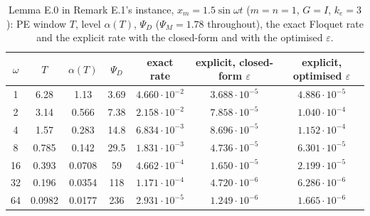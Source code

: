 \begin{table}[htbp]
\centering
\small
\caption{Lemma E.0 in Remark E.1's instance, $x_m=1.5\sin\omega t$ ($m=n=1$, $G=I$, $k_e=3$): PE window $T$, level
$\alpha(T)$, $\Psi_D$ ($\Psi_M=1.78$ throughout), the exact Floquet rate and the explicit rate with the closed-form
and with the optimised $\varepsilon$.}
\label{tab:evidence:explicitomega}
\begin{tabular}{@{}ccccccc@{}}
\toprule
$\omega$ & $T$ & $\alpha(T)$ & $\Psi_D$ & exact rate & explicit, closed-form $\varepsilon$
  & explicit, optimised $\varepsilon$\\
\midrule
1  & 6.28   & 1.13   & 3.69 & $4.660\cdot10^{-2}$ & $3.688\cdot10^{-5}$ & $4.886\cdot10^{-5}$\\
2  & 3.14   & 0.566  & 7.38 & $2.158\cdot10^{-2}$ & $7.858\cdot10^{-5}$ & $1.040\cdot10^{-4}$\\
4  & 1.57   & 0.283  & 14.8 & $6.834\cdot10^{-3}$ & $8.696\cdot10^{-5}$ & $1.152\cdot10^{-4}$\\
8  & 0.785  & 0.142  & 29.5 & $1.831\cdot10^{-3}$ & $4.736\cdot10^{-5}$ & $6.301\cdot10^{-5}$\\
16 & 0.393  & 0.0708 & 59   & $4.662\cdot10^{-4}$ & $1.650\cdot10^{-5}$ & $2.199\cdot10^{-5}$\\
32 & 0.196  & 0.0354 & 118  & $1.171\cdot10^{-4}$ & $4.720\cdot10^{-6}$ & $6.286\cdot10^{-6}$\\
64 & 0.0982 & 0.0177 & 236  & $2.931\cdot10^{-5}$ & $1.249\cdot10^{-6}$ & $1.665\cdot10^{-6}$\\
\bottomrule
\end{tabular}
\end{table}

